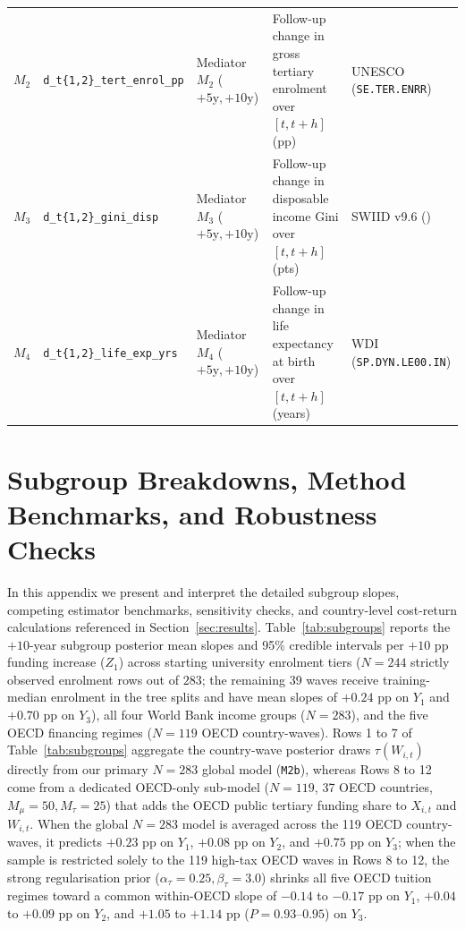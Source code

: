 \documentclass[11pt,a4paper]{article}
\providecommand{\FloatBarrier}{}
\newcommand{\co}{\cellcolor{colodd}}
\newcommand{\ce}{\cellcolor{coleven}}
\begin{document}
\begin{table}[htbp]
{\begin{tabular}{l|l|l|l|l}
    \rowcolor{rowodd}
    \textbf{$M_2$} & \co \texttt{d\_t\{1,2\}\_tert\_enrol\_pp} & Mediator $M_2$ ($+5\text{y}, +10\text{y}$) & \co Follow-up change in gross tertiary enrolment over $[t, t+h]$ (pp) & UNESCO (\texttt{SE.TER.ENRR}) \\
    \rowcolor{roweven}
    \textbf{$M_3$} & \ce \texttt{d\_t\{1,2\}\_gini\_disp} & Mediator $M_3$ ($+5\text{y}, +10\text{y}$) & \ce Follow-up change in disposable income Gini over $[t, t+h]$ (pts) & SWIID v9.6 (\citealt{solt2020swiid}) \\
    \rowcolor{rowodd}
    \textbf{$M_4$} & \co \texttt{d\_t\{1,2\}\_life\_exp\_yrs} & Mediator $M_4$ ($+5\text{y}, +10\text{y}$) & \co Follow-up change in life expectancy at birth over $[t, t+h]$ (years) & WDI (\texttt{SP.DYN.LE00.IN}) \\
    \bottomrule
  \end{tabular}%
  }
\end{table}
\FloatBarrier

\section{Subgroup Breakdowns, Method Benchmarks, and Robustness Checks}
\label{app:benchmarks}

In this appendix we present and interpret the detailed subgroup slopes, competing estimator benchmarks, sensitivity checks, and country-level cost-return calculations referenced in Section~\ref{sec:results}. Table~\ref{tab:subgroups} reports the $+10$-year subgroup posterior mean slopes and 95\% credible intervals per $+10$ pp funding increase ($Z_1$) across starting university enrolment tiers ($N = 244$ strictly observed enrolment rows out of $283$; the remaining 39 waves receive training-median enrolment in the tree splits and have mean slopes of $+0.24$ pp on $Y_1$ and $+0.70$ pp on $Y_3$), all four World Bank income groups ($N = 283$), and the five OECD financing regimes ($N = 119$ OECD country-waves). Rows 1 to 7 of Table~\ref{tab:subgroups} aggregate the country-wave posterior draws $\tau(W_{i,t})$ directly from our primary $N = 283$ global model (\texttt{M2b}), whereas Rows 8 to 12 come from a dedicated OECD-only sub-model ($N = 119$, 37 OECD countries, $M_\mu = 50, M_\tau = 25$) that adds the OECD public tertiary funding share to $X_{i,t}$ and $W_{i,t}$. When the global $N = 283$ model is averaged across the 119 OECD country-waves, it predicts $+0.23$ pp on $Y_1$, $+0.08$ pp on $Y_2$, and $+0.75$ pp on $Y_3$; when the sample is restricted solely to the 119 high-tax OECD waves in Rows 8 to 12, the strong regularisation prior ($\alpha_\tau = 0.25, \beta_\tau = 3.0$) shrinks all five OECD tuition regimes toward a common within-OECD slope of $-0.14$ to $-0.17$ pp on $Y_1$, $+0.04$ to $+0.09$ pp on $Y_2$, and $+1.05$ to $+1.14$ pp ($P = 0.93\text{--}0.95$) on $Y_3$.
\end{document}
